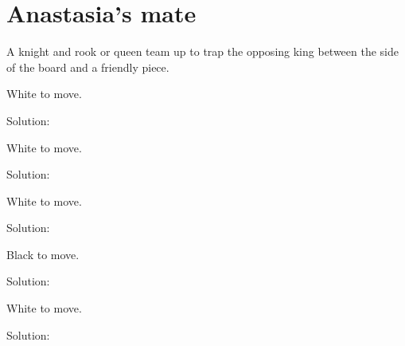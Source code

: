 \documentclass{book}
\begin{document}
\section{Anastasia's mate}
A knight and rook or queen team up to trap the opposing king between the side of the board and a friendly piece.\begin{multicols}{2} 
\begin{samepage} 
\newgame 


 
\showboard
 
 White to move. 
 
Solution: 
 
\end{samepage}\begin{samepage} 
\newgame 


 
\showboard
 
 White to move. 
 
Solution: 
 
\end{samepage}\begin{samepage} 
\newgame 


 
\showboard
 
 White to move. 
 
Solution: 
 
\end{samepage}\begin{samepage} 
\newgame 


 
\showboard
 
 Black to move. 
 
Solution: 
 
\end{samepage}\begin{samepage} 
\newgame 


 
\showboard
 
 White to move. 
 
Solution: 
 
\end{samepage}\end{multicols} 
\newpage 
\end{document}
